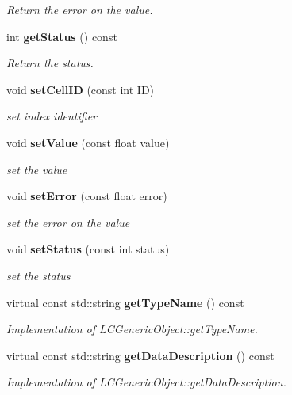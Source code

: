 \begin{DoxyCompactItemize}
\begin{DoxyCompactList}\small\item\em Return the error on the value. \end{DoxyCompactList}\item 
int {\bf get\-Status} () const \label{classCALICE_1_1SimpleValue_a1690e6ce44ea335f86853bf3e9e2e252}

\begin{DoxyCompactList}\small\item\em Return the status. \end{DoxyCompactList}\item 
void {\bf set\-Cell\-I\-D} (const int I\-D)\label{classCALICE_1_1SimpleValue_a1d0bf64c141a1eab8230cff9bedad99a}

\begin{DoxyCompactList}\small\item\em set index identifier \end{DoxyCompactList}\item 
void {\bf set\-Value} (const float value)\label{classCALICE_1_1SimpleValue_a3cb312cbed5170e517a8cb6988720374}

\begin{DoxyCompactList}\small\item\em set the value \end{DoxyCompactList}\item 
void {\bf set\-Error} (const float error)\label{classCALICE_1_1SimpleValue_a2ab0751649b263ce97ad6353c3a74b93}

\begin{DoxyCompactList}\small\item\em set the error on the value \end{DoxyCompactList}\item 
void {\bf set\-Status} (const int status)\label{classCALICE_1_1SimpleValue_a82caceee3e9f3757bd69be212788e4ad}

\begin{DoxyCompactList}\small\item\em set the status \end{DoxyCompactList}\item 
virtual const std\-::string {\bf get\-Type\-Name} () const \label{classCALICE_1_1SimpleValue_abbddaf6f2960066e61712572b74fa27c}

\begin{DoxyCompactList}\small\item\em Implementation of L\-C\-Generic\-Object\-::get\-Type\-Name. \end{DoxyCompactList}\item 
virtual const std\-::string {\bf get\-Data\-Description} () const \label{classCALICE_1_1SimpleValue_a8ee24ee2c956cbec74a8209e84594694}

\begin{DoxyCompactList}\small\item\em Implementation of L\-C\-Generic\-Object\-::get\-Data\-Description. \end{DoxyCompactList}\end{DoxyCompactItemize}


